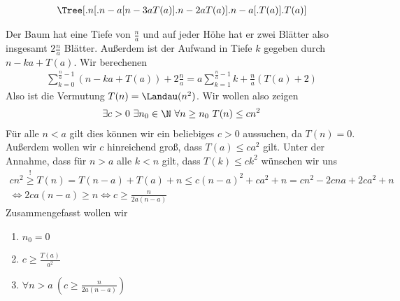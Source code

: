 \begin{solution}

	\begin{align*}
	\Tree [.n [.n-a [ n-3a T(a) ].n-2a T(a) ].n-a [.T(a) ].T(a) ]
	\end{align*}

	Der Baum hat eine Tiefe von $\frac{n}{a}$ und auf jeder Höhe hat er zwei Blätter also insgesamt $2\frac{n}{a}$ Blätter. Außerdem ist der Aufwand in Tiefe $k$ gegeben durch $n - ka + T(a)$. Wir berechenen
	\begin{align*}
	\sum_{k=0}^{\frac{n}{a} - 1} (n - ka + T(a)) + 2 \frac{n}{a} = a \sum_{k = 1}^{\frac{n}{a} - 1} k + \frac{n}{a} (T(a) + 2)
	\end{align*}
	Also ist die Vermutung $T(n) = \Landau(n^2)$. Wir wollen also zeigen
	\begin{align*}
	\exists c >0 \ \exists n_0 \in \N \ \forall n \geq n_0 \ T(n) \leq c n^2
	\end{align*}
	Für alle $n < a$ gilt dies können wir ein beliebiges $c > 0$ aussuchen, da $T(n) = 0$. Außerdem wollen wir $c$ hinreichend groß, dass $T(a) \leq c a^2$ gilt. Unter der Annahme, dass für $n > a$ alle $k < n$ gilt, dass $T(k) \leq c k^2$ wünschen wir uns
	\begin{align*}
	c n^2 \stackrel{!}{\geq} T(n) = T(n - a) + T(a) + n \leq c(n - a)^2 + ca^2 + n = cn^2 - 2cna + 2ca^2 + n \\
	\Leftrightarrow 2ca(n - a) \geq n \Leftrightarrow c \geq \frac{n}{2a(n - a)}
	\end{align*}
	Zusammengefasst wollen wir
	\begin{enumerate}
		\item $n_0 = 0$
		\item $c \geq \frac{T(a)}{a^2}$
		\item $\forall n > a \ (c \geq \frac{n}{2a(n - a)})$
	\end{enumerate}
\end{solution}


